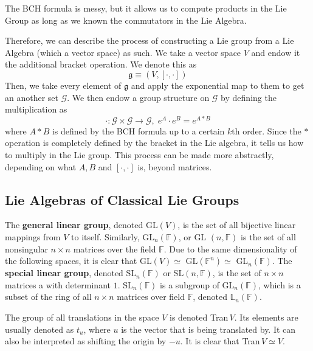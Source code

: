   The BCH formula is messy, but it allows us to compute products in the Lie Group as long as we known the commutators in the Lie Algebra. 

  Therefore, we can describe the process of constructing a Lie group from a Lie Algebra (which a vector space) as such. We take a vector space $V$ and endow it the additional bracket operation. We denote this as
  \begin{equation}
    \mathfrak{g} \equiv (V, [\cdot, \cdot])
  \end{equation}
  Then, we take every element of $\mathfrak{g}$ and apply the exponential map to them to get an another set $\mathcal{G}$. We then endow a group structure on $\mathcal{G}$ by defining the multiplication as 
  \begin{equation}
    \cdot: \mathcal{G} \times \mathcal{G} \rightarrow \mathcal{G}, \; e^A \cdot e^B = e^{A * B}
  \end{equation}
  where $A*B$ is defined by the BCH formula up to a certain $k$th order. Since the $*$ operation is completely defined by the bracket in the Lie algebra, it tells us how to multiply in the Lie group. This process can be made more abstractly, depending on what $A, B$ and $[\cdot,\cdot]$ is, beyond matrices. 

\subsection{Lie Algebras of Classical Lie Groups}

  \begin{definition}
    The \textbf{general linear group}, denoted GL$(V)$, is the set of all bijective linear mappings from $V$ to itself. Similarly, GL$_{n}(\mathbb{F})$, or GL $(n, \mathbb{F})$ is the set of all nonsingular $n \times n$ matrices over the field $\mathbb{F}$. Due to the same dimensionality of the following spaces, it is clear that GL$(V) \simeq$ GL$(\mathbb{F}^{n}) \simeq$ GL$_{n}(\mathbb{F})$. The \textbf{special linear group}, denoted SL$_{n} (\mathbb{F})$ or SL$(n, \mathbb{F})$, is the set of $n\times n$ matrices a with determinant $1$. SL$_{n}(\mathbb{F})$ is a subgroup of GL$_{n}(\mathbb{F})$, which is a subset of the ring of all $n \times n$ matrices over field $\mathbb{F}$, denoted $\mathbb{L}_{n}(\mathbb{F})$. 
  \end{definition}

  \begin{definition}
    The group of all translations in the space $V$ is denoted Tran$\,V$. Its elements are usually denoted as $t_{u}$, where $u$ is the vector that is being translated by. It can also be interpreted as shifting the origin by $-u$. It is clear that Tran$\,V \simeq V$. 
  \end{definition}


